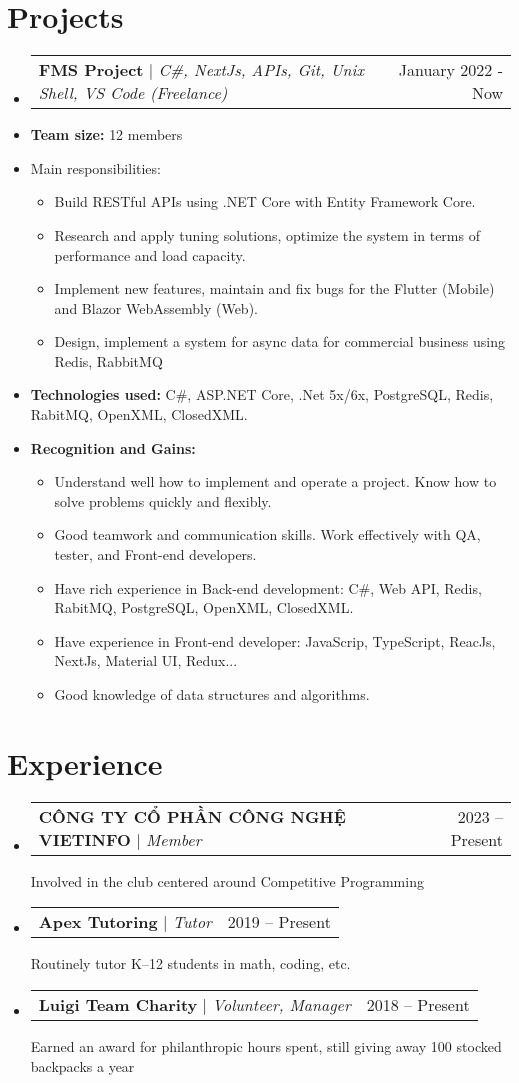 \documentclass[letterpaper,11pt]{article}
\makeatletter
\newcommand{\resumeItem}[1]{
  \item\small{
    {#1 \vspace{-2pt}}
  }
}
\newcommand{\resumeProjectHeading}[2]{
    \item
    \begin{tabular*}{0.97\textwidth}{l@{\extracolsep{\fill}}r}
      \small#1 & #2 \\
    \end{tabular*}\vspace{-7pt}
}
\newcommand{\resumeSubHeadingListStart}{\begin{itemize}[leftmargin=0.15in, label={}]}
\newcommand{\resumeSubHeadingListEnd}{\end{itemize}}
\newcommand{\resumeItemListStart}{\begin{itemize}}
\newcommand{\resumeItemListEnd}{\end{itemize}\vspace{-5pt}}
\makeatother
\begin{document}
\section{Projects}
\resumeSubHeadingListStart
  \resumeProjectHeading
  {\textbf{FMS Project} $|$ \footnotesize\emph{C\#, NextJs, APIs, Git, Unix Shell, VS Code (Freelance)}}{January 2022 - Now}
  \item\textbf{Team size:} {12 members} \item{Main responsibilities:} 
  \resumeItemListStart
    \resumeItem{Build RESTful APIs using .NET Core with Entity Framework Core.} 
    \resumeItem{Research and apply tuning solutions, optimize the system in terms of performance and load capacity.} 
    \resumeItem{Implement new features, maintain and fix bugs for the Flutter (Mobile) and Blazor WebAssembly (Web).}
    \resumeItem{Design, implement a system for async data for commercial business using Redis, RabbitMQ}
  \resumeItemListEnd
  \item {\textbf{Technologies used:} {C\#, ASP.NET Core, .Net 5x/6x, PostgreSQL, Redis, RabitMQ, OpenXML, ClosedXML.}}
  \item {\textbf{Recognition and Gains:}}
  \resumeItemListStart
    \resumeItem{Understand well how to implement and operate a project. Know how to solve problems quickly and ﬂexibly.}
    \resumeItem{Good teamwork and communication skills. Work eﬀectively with QA, tester, and Front-end developers.}
    \resumeItem{Have rich experience in Back-end development: C\#, Web API, Redis, RabitMQ, PostgreSQL, OpenXML, ClosedXML.}
    \resumeItem{Have experience in Front-end developer: JavaScrip, TypeScript, ReacJs, NextJs, Material UI, Redux...}
    \resumeItem{Good knowledge of data structures and algorithms.}
  \resumeItemListEnd
\resumeSubHeadingListEnd



\section{Experience}
\resumeSubHeadingListStart
\resumeProjectHeading
{\textbf{CÔNG TY CỔ PHẦN CÔNG NGHỆ VIETINFO} $|$ \footnotesize\emph{Member}\vspace{8pt}}{ 2023 -- Present}
{\small{Involved in the club centered around Competitive Programming}}

\resumeProjectHeading
{\textbf{Apex Tutoring}\vspace{8pt} $|$ \footnotesize\emph{Tutor}}{2019 -- Present}
\small{Routinely tutor K--12 students in math, coding, etc.}

\resumeProjectHeading
{\textbf{Luigi Team Charity} $|$ \footnotesize\emph{Volunteer, Manager}\vspace{8pt}}{2018 -- Present}
{\small{Earned an award for philanthropic hours spent, still giving away 100 stocked backpacks a year}}

\resumeSubHeadingListEnd
\end{document}
